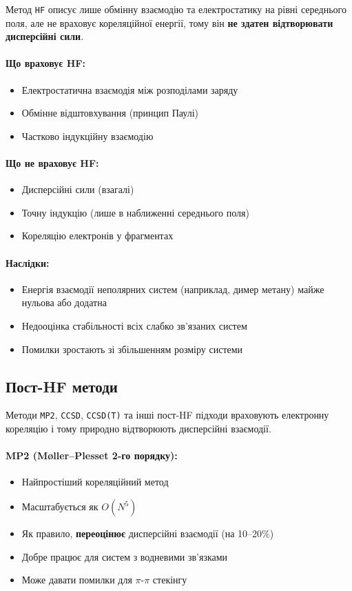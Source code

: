 Метод \texttt{HF} описує лише обмінну взаємодію та електростатику на рівні середнього поля, але не враховує кореляційної енергії, тому він \textbf{не здатен відтворювати дисперсійні сили}.

\paragraph{Що враховує HF:}
\begin{itemize}
    \item Електростатична взаємодія між розподілами заряду
    \item Обмінне відштовхування (принцип Паулі)
    \item Частково індукційну взаємодію
\end{itemize}

\paragraph{Що не враховує HF:}
\begin{itemize}
    \item Дисперсійні сили (взагалі)
    \item Точну індукцію (лише в наближенні середнього поля)
    \item Кореляцію електронів у фрагментах
\end{itemize}

\paragraph{Наслідки:}
\begin{itemize}
    \item Енергія взаємодії неполярних систем (наприклад, димер метану) майже нульова або додатна
    \item Недооцінка стабільності всіх слабко зв'язаних систем
    \item Помилки зростають зі збільшенням розміру системи
\end{itemize}

\subsection{Пост-HF методи}

Методи \texttt{MP2}, \texttt{CCSD}, \texttt{CCSD(T)} та інші пост-HF підходи враховують електронну кореляцію і тому природно відтворюють дисперсійні взаємодії.

\paragraph{MP2 (Møller--Plesset 2-го порядку):}
\begin{itemize}
    \item Найпростіший кореляційний метод
    \item Масштабується як \(O(N^5)\)
    \item Як правило, \textbf{переоцінює} дисперсійні взаємодії (на 10--20\%)
    \item Добре працює для систем з водневими зв'язками
    \item Може давати помилки для \(\pi\)-\(\pi\) стекінгу
\end{itemize}

